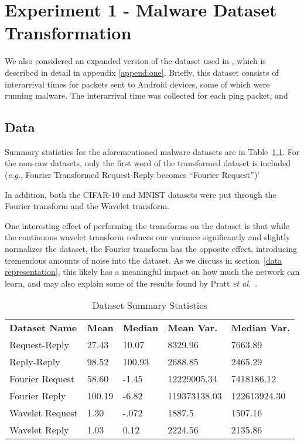\chapter{Experiment 1 - Malware Dataset Transformation}
\label{chap:three}



We also considered an expanded version of the dataset used in \cite{watkins2013using}, which is described in detail in appendix \ref{append:one}. 
Briefly, this dataset consists of interarrival times for packets sent to Android devices, some of which were running malware.
The interarrival time was collected for each ping packet, and 

\section{Data}
Summary statistics for the aforementioned malware datasets are in Table~\ref{Tab:summary}. 
For the non-raw datasets, only the first word of the transformed dataset is included (\textit{e.g.}, Fourier Transformed Request-Reply becomes ``Fourier Request'')'

In addition, both the CIFAR-10 and MNIST datasets were put through the Fourier transform and the Wavelet transform.

One interesting effect of performing the transforms on the dataset is that while the continuous wavelet transform reduces our variance significantly and slightly normalizes the dataset, the Fourier transform has the opposite effect, introducing tremendous amounts of noise into the dataset.
As we discuss in section~\ref{data representation}, this likely has a meaningful impact on how much the network can learn, and may also explain some of the results found by Pratt \textit{et al.}~\cite{pratt2017fcnn}.

\renewcommand{\thefootnote}{*} 
\begin{table}[h]
\caption{Dataset Summary Statistics}
\centering
\label{Tab:summary}	
\begin{tabular}{l|llll}
\textbf{Dataset Name} & \textbf{Mean} & \textbf{Median} & \textbf{Mean Var.} & \textbf{Median Var.} \\\cline{1-5}
Request-Reply         & 27.43    & 10.07    & 8329.96    & 7663.89 \\
Reply-Reply           & 98.52    & 100.93   & 2688.85    & 2465.29 \\
Fourier Request       & 58.60\footnotemark    & -1.45    & 12229005.34    & 7418186.12 \\
Fourier Reply         & 100.19\footnotemark    & -6.82    & 119373138.03    & 122613924.30 \\
Wavelet Request       & 1.30    & -.072    & 1887.5    & 1507.16 \\
Wavelet Reply         & 1.03    & 0.12    & 2224.56    & 2135.86                 
\end{tabular}
\end{table}

